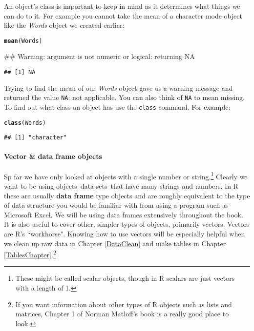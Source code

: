 \documentclass[ChapterTOCs,krantz1]{krantz}\usepackage{graphicx, color}
\makeatletter
\newcommand{\hlfunctioncall}[1]{\textcolor[rgb]{0.501960784313725,0,0.329411764705882}{\textbf{#1}}}%
\newenvironment{kframe}{%
 \def\at@end@of@kframe{}%
 \ifinner\ifhmode%
  \def\at@end@of@kframe{\end{minipage}}%
  \begin{minipage}{\columnwidth}%
 \fi\fi%
 \def\FrameCommand##1{\hskip\@totalleftmargin \hskip-\fboxsep
 \colorbox{shadecolor}{##1}\hskip-\fboxsep
     \hskip-\linewidth \hskip-\@totalleftmargin \hskip\columnwidth}%
 \MakeFramed {\advance\hsize-\width
   \@totalleftmargin\z@ \linewidth\hsize
   \@setminipage}}%
 {\par\unskip\endMakeFramed%
 \at@end@of@kframe}
\newenvironment{knitrout}{}{} %
\makeatother
\begin{document}
An object's class is important to keep in mind as it determines what things we can do to it. For example you cannot take the mean of a character mode object like the {\emph{Words}} object we created earlier:

\begin{knitrout}
\color{fgcolor}\begin{kframe}
\begin{alltt}
\hlfunctioncall{mean}(Words)
\end{alltt}


{\ttfamily\noindent\textcolor{warningcolor}{\#\# Warning: argument is not numeric or logical: returning NA}}\begin{verbatim}
## [1] NA
\end{verbatim}
\end{kframe}
\end{knitrout}


\noindent Trying to find the mean of our {\emph{Words}} object gave us a warning message and returned the value {\tt{NA}}: not applicable. You can also think of {\tt{NA}} to mean missing. To find out what class an object has use the {\tt{class}} command. For example:

\begin{knitrout}
\color{fgcolor}\begin{kframe}
\begin{alltt}
\hlfunctioncall{class}(Words)
\end{alltt}
\begin{verbatim}
## [1] "character"
\end{verbatim}
\end{kframe}
\end{knitrout}


\paragraph{Vector \& data frame objects}

Sp far we have only looked at objects with a single number or string.\footnote{These might be called scalar objects, though in R scalars are just vectors with a length of 1.} Clearly we want to be using objects--data sets--that have many strings and numbers. In R these are usually {\bf{data frame}} type objects and are roughly equivalent to the type of data structure you would be familiar with from using a program such as Microsoft Excel. We will be using data frames extensively throughout the book. It is also useful to cover other, simpler types of objects, primarily vectors. Vectors are R's ``workhorse".\cite{Matloff2011} Knowing how to use vectors will be especially helpful when we clean up raw data in Chapter \ref{DataClean} and make tables in Chapter \ref{TablesChapter}.\footnote{If you want information about other types of R objects such as lists and matrices, Chapter 1 of Norman Matloff's book\cite{Matlof2011} is a really good place to look.} \\[0.25cm]
\end{document}

